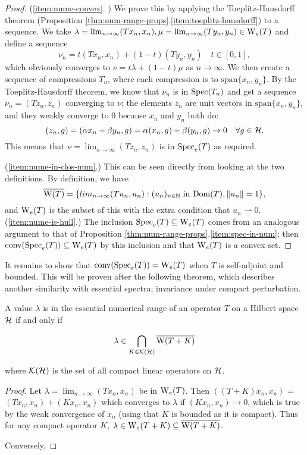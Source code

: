 \documentclass[../main.tex]{subfiles}
\begin{document}
\begin{proof}
(\ref{item:nume-convex}. \cite{bogli2020essential}) We prove this by applying the Toeplitz-Hausdorff theorem (Proposition \ref{thm:num-range-props}.\ref{item:toeplitz-hausdorff}) to a sequence. We take $\lambda = \lim_{n \rightarrow \infty}(Tx_n, x_n), \mu = \lim_{n \rightarrow \infty}(Ty_n, y_n) \in \mathrm{W}_e(T)$
and define a sequence $$\nu_n = t(Tx_n, x_n) + (1-t)(Ty_n, y_n) \quad t \in [0, 1],$$ which obviously converges to $\nu = t\lambda + (1-t)\mu$ as 
$n \rightarrow \infty$.
We then create a sequence of compressions $T_n$, where each compression is to $\text{span}\{x_n, y_n\}$. By the Toeplitz-Hausdorff theorem,
we know that $\nu_n$ is in $\mathrm{Spec}(T_n)$ and get a sequence $\nu_n = (Tz_n, z_n)$ converging to $\nu$; the elements $z_n$ are unit vectors in $\text{span}\{x_n, y_n\}$, and they weakly converge to 0 because $x_n$ and $y_n$ both do:
$$(z_n, g) = (\alpha x_n + \beta y_n, g) = \alpha(x_n, g) + \beta(y_n, g) \rightarrow 0 \quad \forall g \in \mathcal{H}.$$
This means that $\nu = \lim_{n \rightarrow \infty}(Tz_n, z_n)$ is in $\mathrm{Spec}_e(T)$ as required.

(\ref{item:nume-in-clos-num}.) This can be seen directly from looking at the two definitions. By definition, we have
$$\overline{\mathrm{W}(T)} = \{lim_{n \rightarrow \infty}( Tu_n, u_n ) : (u_n)_{n \in \mathbb{N}}\text{ in } \mathrm{Dom}(T), \|u_n\|=1\},$$ and $\mathrm{W}_e(T)$ is the subset of this with the extra condition
that $u_n \rightharpoonup 0$.
\\
(\ref{item:nume-is-hull}.) The inclusion $\mathrm{Spec}_e(T) \subseteq \mathrm{W}_e(T)$ comes from an analogous argument
to that of Proposition \ref{thm:num-range-props}.\ref{item:spec-in-num}; then $\mathrm{conv}(\mathrm{Spec}_e(T)) \subseteq \mathrm{W}_e(T)$
by this inclusion and that $\mathrm{W}_e(T)$ is a convex set.
\end{proof}
It remains to show that $\mathrm{conv}(\mathrm{Spec}_e(T)) = \mathrm{W}_e(T)$ when $T$ is self-adjoint and bounded. 
This will be proven after the following theorem, which describes another similarity with essential spectra; invariance under compact perturbation.

\begin{theorem}
A value $\lambda$ is in the essential numerical range of an operator $T$ on a Hilbert space $\mathcal{H}$ if and only if

$$\lambda \in \bigcap_{K \in \mathcal{K}(\mathcal{H})} \overline{\mathrm{W}(T+K)}$$

where $\mathcal{K}(\mathcal{H})$ is the set of all compact linear operators on $\mathcal{H}$. 
\end{theorem}
\begin{proof}
Let $\lambda = \lim_{n \rightarrow \infty}(Tx_n, x_n)$ be in $\mathrm{W}_e(T)$. Then $((T+K)x_n, x_n)$ = $(Tx_n, x_n) + (Kx_n, x_n)$ 
which converges to $\lambda$ if $(Kx_n, x_n) \rightarrow 0$, which is true by the weak convergence of $x_n$ (using that $K$ is bounded as it is compact). Thus for any compact operator $K$, 
$\lambda \in \mathrm{W}_e(T+K) \subseteq \overline{\mathrm{W}(T+K)}$.

Conversely, %
\end{proof}
\end{document}
